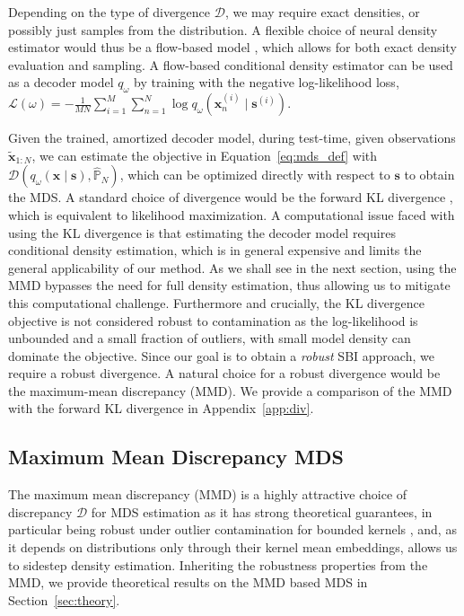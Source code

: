 \documentclass{article}
\theoremstyle{plain}
\theoremstyle{definition}
\theoremstyle{remark}
\begin{document}
Depending on the type of divergence \( \mathcal{D} \), we may require exact densities, or possibly just samples from the distribution. A flexible choice of neural density estimator would thus be a flow-based model \citep{papamakarios2017masked, durkanNeuralSplineFlows2019a}, which allows for both exact density evaluation and sampling. A flow-based conditional density estimator can be used as a decoder model \( q_\omega \) by training with the negative log-likelihood loss, \( \mathcal{L}(\omega) = -\frac{1}{MN}\sum_{i=1}^M\sum_{n=1}^N \log q_\omega(\mathbf{x}_n^{(i)}\mid \mathbf{s}^{(i)}) \).

Given the trained, amortized decoder model, during test-time, given observations \( \tilde{\mathbf{x}}_{1:N} \), we can estimate the objective in Equation~\eqref{eq:mds_def} with \( \mathcal{D}(q_\omega(\mathbf{x} \mid\mathbf{s}),\hat{\mathbb{P}}_N) \), which can be optimized directly with respect to \( \mathbf{s} \) to obtain the MDS. A standard choice of divergence would be the forward KL divergence \citep{kullback1951information}, which is equivalent to likelihood maximization. A computational issue faced with using the KL divergence is that estimating the decoder model requires conditional density estimation, which is in general expensive and limits the general applicability of our method. As we shall see in the next section, using the MMD bypasses the need for full density estimation, thus allowing us to mitigate this computational challenge. Furthermore and crucially, the KL divergence objective is not considered robust to contamination as the log-likelihood is unbounded and a small fraction of outliers, with small model density can dominate the objective. Since our goal is to obtain a \emph{robust} SBI approach, we require a robust divergence. A natural choice for a robust divergence would be the maximum-mean discrepancy (MMD). We provide a comparison of the MMD with the forward KL divergence in Appendix~\ref{app:div}. 

\subsection{Maximum Mean Discrepancy MDS}
\label{sec:mmd-mds}

The maximum mean discrepancy (MMD) \citep{grettonKernelTwoSampleTest2012} is a highly attractive choice of discrepancy \( \mathcal{D} \) for MDS estimation as it has strong theoretical guarantees, in particular being robust under outlier contamination for bounded kernels \citep{cherief-abdellatifFiniteSampleProperties2022a}, and, as it depends on distributions only through their kernel mean embeddings, allows us to sidestep density estimation. Inheriting the robustness properties from the MMD, we provide theoretical results on the MMD based MDS in Section~\ref{sec:theory}.
\end{document}
